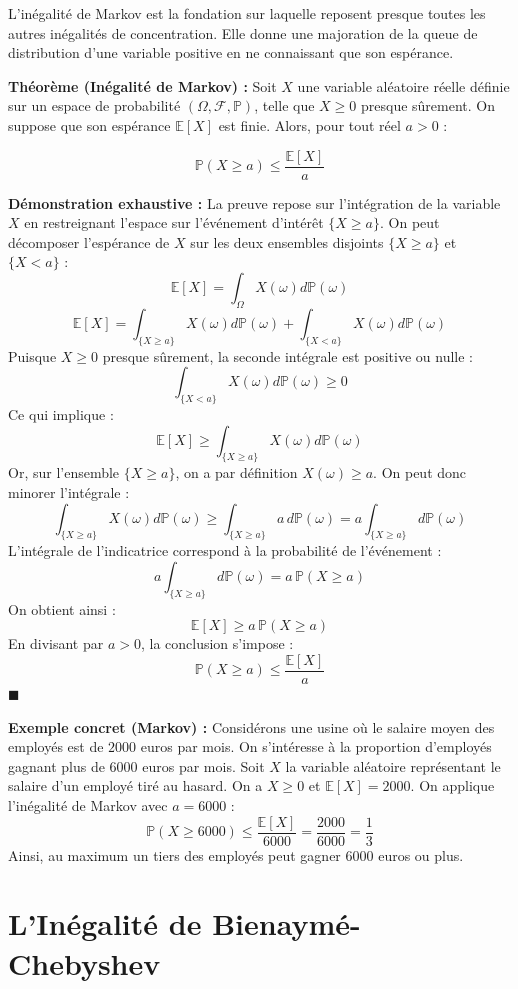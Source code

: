 \documentclass[11pt,a4paper]{article}
\begin{document}
L'inégalité de Markov est la fondation sur laquelle reposent presque toutes les autres inégalités de concentration. Elle donne une majoration de la queue de distribution d'une variable positive en ne connaissant que son espérance.

\textbf{Théorème (Inégalité de Markov) :}
Soit $X$ une variable aléatoire réelle définie sur un espace de probabilité $(\Omega, \mathcal{F}, \mathbb{P})$, telle que $X \ge 0$ presque sûrement. On suppose que son espérance $\mathbb{E}[X]$ est finie. Alors, pour tout réel $a > 0$ :

$$ \mathbb{P}(X \ge a) \le \frac{\mathbb{E}[X]}{a} $$

\textbf{Démonstration exhaustive :}
La preuve repose sur l'intégration de la variable $X$ en restreignant l'espace sur l'événement d'intérêt $\{X \ge a\}$.
On peut décomposer l'espérance de $X$ sur les deux ensembles disjoints $\{X \ge a\}$ et $\{X < a\}$ :
$$ \mathbb{E}[X] = \int_{\Omega} X(\omega) d\mathbb{P}(\omega) $$
$$ \mathbb{E}[X] = \int_{\{X \ge a\}} X(\omega) d\mathbb{P}(\omega) + \int_{\{X < a\}} X(\omega) d\mathbb{P}(\omega) $$
Puisque $X \ge 0$ presque sûrement, la seconde intégrale est positive ou nulle :
$$ \int_{\{X < a\}} X(\omega) d\mathbb{P}(\omega) \ge 0 $$
Ce qui implique :
$$ \mathbb{E}[X] \ge \int_{\{X \ge a\}} X(\omega) d\mathbb{P}(\omega) $$
Or, sur l'ensemble $\{X \ge a\}$, on a par définition $X(\omega) \ge a$. On peut donc minorer l'intégrale :
$$ \int_{\{X \ge a\}} X(\omega) d\mathbb{P}(\omega) \ge \int_{\{X \ge a\}} a \, d\mathbb{P}(\omega) = a \int_{\{X \ge a\}} d\mathbb{P}(\omega) $$
L'intégrale de l'indicatrice correspond à la probabilité de l'événement :
$$ a \int_{\{X \ge a\}} d\mathbb{P}(\omega) = a \, \mathbb{P}(X \ge a) $$
On obtient ainsi :
$$ \mathbb{E}[X] \ge a \, \mathbb{P}(X \ge a) $$
En divisant par $a > 0$, la conclusion s'impose :
$$ \mathbb{P}(X \ge a) \le \frac{\mathbb{E}[X]}{a} $$
$\blacksquare$

\textbf{Exemple concret (Markov) :}
Considérons une usine où le salaire moyen des employés est de $2000$ euros par mois. On s'intéresse à la proportion d'employés gagnant plus de $6000$ euros par mois. Soit $X$ la variable aléatoire représentant le salaire d'un employé tiré au hasard. On a $X \ge 0$ et $\mathbb{E}[X] = 2000$.
On applique l'inégalité de Markov avec $a = 6000$ :
$$ \mathbb{P}(X \ge 6000) \le \frac{\mathbb{E}[X]}{6000} = \frac{2000}{6000} = \frac{1}{3} $$
Ainsi, au maximum un tiers des employés peut gagner $6000$ euros ou plus.

\section{L'Inégalité de Bienaymé-Chebyshev}
\end{document}
